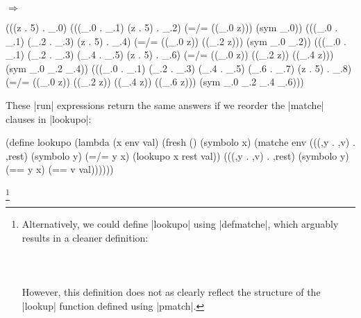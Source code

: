 \noindent{}

$\Rightarrow$

\begin{schemeresponsebox}
(((z . 5) . _.0)
 (((_.0 . _.1) (z . 5) . _.2)
  (=/= ((_.0 z))) (sym _.0))
 (((_.0 . _.1) (_.2 . _.3) (z . 5) . _.4)
  (=/= ((_.0 z)) ((_.2 z))) (sym _.0 _.2))
 (((_.0 . _.1) (_.2 . _.3) (_.4 . _.5) (z . 5) . _.6)
  (=/= ((_.0 z)) ((_.2 z)) ((_.4 z))) (sym _.0 _.2 _.4))
 (((_.0 . _.1) (_.2 . _.3) (_.4 . _.5) (_.6 . _.7) (z . 5) . _.8)
  (=/= ((_.0 z)) ((_.2 z)) ((_.4 z)) ((_.6 z))) (sym _.0 _.2 _.4 _.6)))
\end{schemeresponsebox}

These \scheme|run| expressions return the same answers if we reorder the \scheme|matche| clauses in \scheme|lookupo|:

\begin{schemedisplay}
(define lookupo
  (lambda (x env val)
    (fresh ()
      (symbolo x)
      (matche env
        (((,y . ,v) . ,rest) (symbolo y)
         (=/= y x) (lookupo x rest val))
        (((,y . ,v) . ,rest) (symbolo y)
         (== y x) (== v val))))))
\end{schemedisplay}




\setbox\boxa{}

\footnote{Alternatively, we could define \scheme|lookupo| using \scheme|defmatche|, which arguably results in a cleaner definition: \\ \ \\ \usebox{\boxa} \\ \ \\ However, this definition does not as clearly reflect the structure of the \scheme|lookup| function defined using \scheme|pmatch|.}
